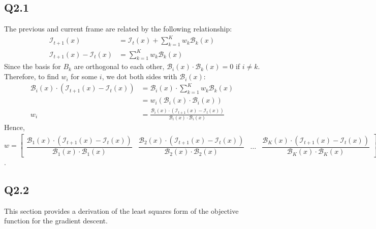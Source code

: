 \documentclass{article} %
\begin{document}
    \subsection*{Q2.1}
    The previous and current frame are related by the following relationship:
    \begin{align*}
    \mathcal{I}_{t+1}\left(x\right)&=\mathcal{I}_{t}\left(x\right)+{\sum}_{k=1}^{K}w_{k}\mathcal{B}_{k}(x)\\
    \mathcal{I}_{t+1}\left(x\right)-\mathcal{I}_{t}\left(x\right)&={\sum }_{k=1}^{K}w_{k}\mathcal{B}_{k}(x)
    \end{align*}
    Since the basis for $B_{k}$ are orthogonal to each other, $\mathcal{B}_{i}\left(x\right)\cdot \mathcal{B}_{k}\left(x\right)=0$ if $i\neq k$. Therefore, to find $w_{i}$ for some $i$, we dot both sides with $\mathcal{B}_{i}(x)$:
    \begin{align*}
    \mathcal{B}_{i}\left(x\right)\cdot \left(\mathcal{I}_{t+1}\left(x\right)-\mathcal{I}_{t}\left(x\right)\right) & =\mathcal{B}_{i}\left(x\right)\cdot {\sum }_{k=1}^{K}w_{k}\mathcal{B}_{k}(x)\\ & =w_{i}\left(\mathcal{B}_{i}\left(x\right)\cdot \mathcal{B}_{i}\left(x\right)\right)\\
    w_{i} & =\frac{\mathcal{B}_{i}\left(x\right)\cdot \left(\mathcal{I}_{t+1}\left(x\right)-\mathcal{I}_{t}\left(x\right)\right)}{\mathcal{B}_{i}\left(x\right)\cdot \mathcal{B}_{i}\left(x\right)}
    \end{align*}
    Hence, $w=\left[\begin{array}{cccc}
    \dfrac{\mathcal{B}_{1}\left(x\right)\cdot \left(\mathcal{I}_{t+1}\left(x\right)-\mathcal{I}_{t}\left(x\right)\right)}{\mathcal{B}_{1}\left(x\right)\cdot \mathcal{B}_{1}\left(x\right)} & \dfrac{\mathcal{B}_{2}\left(x\right)\cdot \left(\mathcal{I}_{t+1}\left(x\right)-\mathcal{I}_{t}\left(x\right)\right)}{\mathcal{B}_{2}\left(x\right)\cdot \mathcal{B}_{2}\left(x\right)} & \ldots & \dfrac{\mathcal{B}_{K}\left(x\right)\cdot \left(\mathcal{I}_{t+1}\left(x\right)-\mathcal{I}_{t}\left(x\right)\right)}{\mathcal{B}_{K}\left(x\right)\cdot \mathcal{B}_{K}\left(x\right)}
    \end{array}\right]^{T}$.
    
    \subsection*{Q2.2}
    This section provides a derivation of the least squares form of the objective function for the gradient descent.
    \medskip
        
\end{document}

